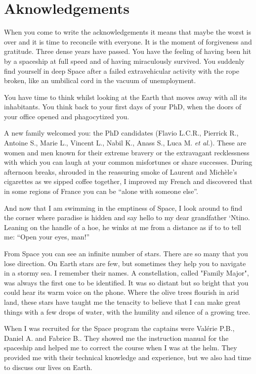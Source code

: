 \chapter*{Aknowledgements}

When you come to write the acknowledgements it means that maybe the worst is over and it is time to reconcile with everyone. It is the moment of forgiveness and gratitude. Three dense years have passed. You have the feeling of having been hit by a spaceship at full speed and of having miraculously survived. You suddenly find yourself in deep Space after a failed extravehicular activity with the rope broken, like an umbilical cord in the vacuum of unemployment. 

You have time to think whilst looking at the Earth that moves away with all its inhabitants. You think back to your first days of your PhD, when the doors of your office opened and phagocytized you.

A new family welcomed you: the PhD candidates (Flavio L.C.R., Pierrick R., Antoine S., Marie L., Vincent L., Nabil K., Anass S., Luca M. \textit{et al.}). These are women and men known for their extreme bravery or the extravagant recklessness with which you can laugh at your common misfortunes or share successes. During afternoon breaks, shrouded in the reassuring smoke of Laurent and Michèle’s cigarettes as we sipped coffee together, I improved my French and discovered that in some regions of France you can be “alone with someone else”.

And now that I am swimming in the emptiness of Space, I look around to find the corner where paradise is hidden and say hello to my dear grandfather ‘Ntino. Leaning on the handle of a hoe, he winks at me from a distance as if to to tell me: “Open your eyes, man!”

From Space you can see an infinite number of stars. There are so many that you lose direction. On Earth stars are few, but sometimes they help you to navigate in a stormy sea. I remember their names. A constellation, called "Family Major", was always the first one to be identified. It was so distant but so bright that you could hear its warm voice on the phone. Where the olive trees flourish in arid land, these stars have taught me the tenacity to believe that I can make great things with a few drops of water, with the humility and silence of a growing tree.

When I was recruited for the Space program the captains were Valérie P.B., Daniel A. and Fabrice B.. They showed me the instruction manual for the spaceship and helped me to correct the course when I was at the helm. They provided me with their technical knowledge and experience, but we also had time to discuss our lives on Earth. 

